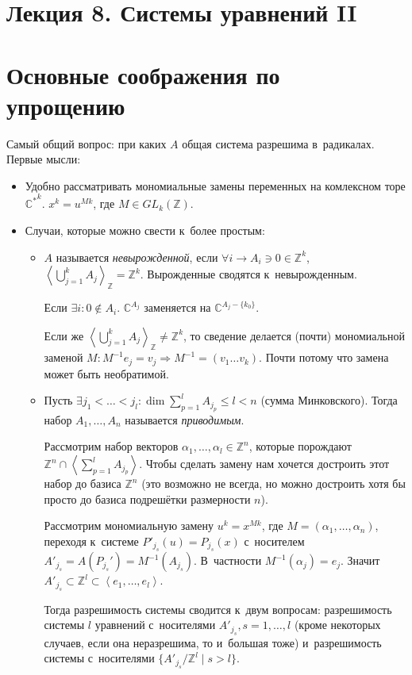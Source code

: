 \documentclass{article}
\begin{document}
\section*{Лекция 8. Системы уравнений II}

\section{Основные соображения по упрощению}

Самый общий вопрос: при каких $A$ общая система разрешима в~радикалах. Первые
мысли:
\begin{itemize}
	\item Удобно рассматривать мономиальные замены переменных на комлексном торе
		${\mathbb{C}^\ast}^k$. $x^k = u^{Mk}$, где $M \in GL_k(\mathbb{Z})$.
	\item Случаи, которые можно свести к~более простым:
		\begin{itemize}
			\item $A$ называется \emph{невырожденной}, если $\forall i \rightarrow
				A_i \ni 0 \in \mathbb{Z}^k$, $\left< \bigcup\limits_{j=1}^k A_j
				\right>_\mathbb{Z} = \mathbb{Z}^k$. Вырожденные сводятся к~невырожденным.

				Если $\exists i: 0 \notin A_i$. $\mathbb{C}^{A_j}$ заменяется на
				$\mathbb{C}^{A_j - \{k_0\}}$.

				Если же $\left< \bigcup\limits_{j=1}^k A_j \right>_\mathbb{Z} \ne
				\mathbb{Z}^k$, то сведение делается (почти) мономиальной заменой
				$M: M^{-1} e_j = v_j \Rightarrow M^{-1} = (v_1 \ldots v_k)$. Почти
				потому что замена может быть необратимой.
			\item Пусть $\exists j_1 < \ldots < j_l: \dim \sum\limits_{p=1}^l A_{j_p}
				\le l < n$ (сумма Минковского). Тогда набор $A_1, \ldots, A_n$ называется
				\emph{приводимым}.

				Рассмотрим набор векторов $\alpha_1, \ldots, \alpha_l
				\in \mathbb{Z}^n$, которые порождают $\mathbb{Z}^n \cap \left<
				\sum\limits_{p=1}^l A_{j_p} \right>$. Чтобы сделать замену нам хочется
				достроить этот набор до базиса $\mathbb{Z}^n$ (это возможно не всегда,
				но можно достроить хотя бы просто до базиса подрешётки размерности $n$).

				Рассмотрим мономиальную замену $u^k = x^{Mk}$, где $M = (\alpha_1,
				\ldots, \alpha_n)$, переходя к~системе $P'_{j_s}(u) = P_{j_s}(x)$
				с~носителем $A'_{j_s} = A(P_{j_s}') = M^{-1}(A_{j_s})$. В~частности
				$M^{-1}(\alpha_j) = e_j$. Значит $A'_{j_s} \subset \mathbb{Z}^l \subset
				\left< e_1, \ldots, e_l \right>$.

				Тогда разрешимость системы сводится к~двум вопросам: разрешимость
				системы $l$ уравнений с~носителями $A'_{j_s}, s = 1, \ldots, l$ (кроме
				некоторых случаев, если она неразрешима, то и~большая тоже)
				и~разрешимость системы с~носителями $\{ A'_{j_s} / {\mathbb{Z}^l} \mid s
				> l\}$.
		\end{itemize}
\end{itemize}
\end{document}

